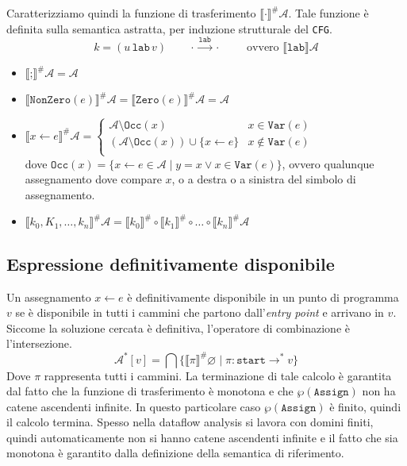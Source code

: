 Caratterizziamo quindi la funzione di trasferimento $\llbracket \cdot \rrbracket^\#\mathcal{A}$. 
Tale funzione è definita sulla semantica astratta, 
per induzione strutturale del \texttt{CFG}.
\[
  k = (u\, \texttt{lab}\, v)  \qquad \cdot \stackrel{\texttt{lab}}{\longrightarrow} \cdot \qquad
  \text{ ovvero }\llbracket \texttt{lab} \rrbracket \mathcal{A}
\]
\begin{itemize}
    \item $\llbracket\texttt{;} \rrbracket^\# \mathcal{A} = \mathcal{A}$
    \item $\llbracket \texttt{NonZero}(e) \rrbracket^\# \mathcal{A} = 
    \llbracket \texttt{Zero}(e) \rrbracket^\# \mathcal{A}
    = \mathcal{A}$
    \item $\llbracket x \gets e \rrbracket^\# \mathcal{A} = 
    \begin{cases}
        \mathcal{A} \setminus \texttt{Occ}(x) & x \in \texttt{Var}(e)\\
        (\mathcal{A} \setminus \texttt{Occ}(x)) \cup \{x \gets e\} & x \notin \texttt{Var}(e)\\
    \end{cases}$
    \\
    dove $\texttt{Occ}(x) = \{x \gets e \in \mathcal{A} \mid y = x \lor x \in \texttt{Var}(e)\}$, ovvero qualunque
    assegnamento dove compare $x$, o a destra o a sinistra del simbolo di assegnamento.
    \item $\llbracket k_0,K_1,\dots,k_n \rrbracket^\# \mathcal{A} = 
    \llbracket k_0 \rrbracket^\# \circ \llbracket k_1 \rrbracket^\# \circ \dots \circ \llbracket k_n \rrbracket^\# \mathcal{A}$
\end{itemize}

\subsection{Espressione definitivamente disponibile}
Un assegnamento $x \gets e$ è definitivamente disponibile in un punto di programma $v$ se è 
disponibile in tutti i cammini che partono dall'\textit{entry point} e arrivano in $v$. Siccome
la soluzione cercata è definitiva, l'operatore di combinazione è l'intersezione.
\begin{equation}
    \mathcal{A}^*[v] = \bigcap \{ \llbracket \pi \rrbracket^\# \varnothing \mid 
    \pi : \texttt{start} \longrightarrow^* v \} 
\end{equation}
Dove $\pi$ rappresenta tutti i cammini. La terminazione di tale calcolo è garantita dal fatto che 
la funzione di trasferimento è monotona e che $\wp(\texttt{Assign})$ non ha catene ascendenti infinite.
In questo particolare caso $\wp(\texttt{Assign})$ è finito, quindi il calcolo termina. Spesso nella 
dataflow analysis si lavora con domini finiti, quindi automaticamente non si hanno catene ascendenti infinite e 
il fatto che sia monotona è garantito dalla definizione della semantica di riferimento.

